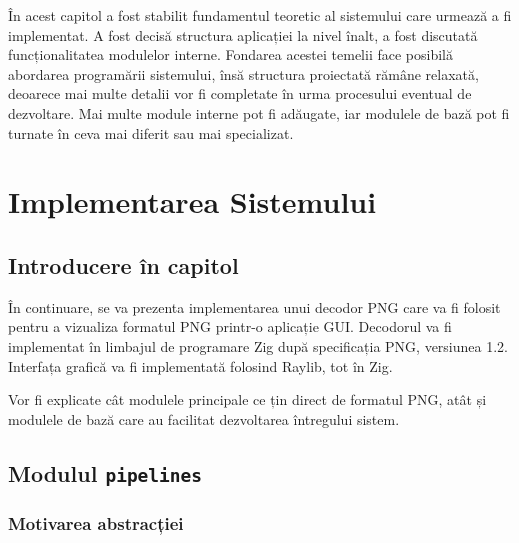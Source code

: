 \documentclass[a4paper,12pt]{report}
\begin{document}
În acest capitol a fost stabilit fundamentul teoretic al sistemului care urmează a fi implementat.
A fost decisă structura aplicației la nivel înalt, a fost discutată funcționalitatea modulelor interne.
Fondarea acestei temelii face posibilă abordarea programării sistemului,
însă structura proiectată rămâne relaxată, deoarece mai multe detalii
vor fi completate în urma procesului eventual de dezvoltare.
Mai multe module interne pot fi adăugate,
iar modulele de bază pot fi turnate în ceva mai diferit sau mai specializat.

\chapter{Implementarea Sistemului}\label{implementation_chapter_title}

\section{Introducere în capitol}

În continuare, se va prezenta implementarea unui decodor \ac{PNG} care va fi folosit pentru
a vizualiza formatul \ac{PNG} printr-o aplicație \ac{GUI}.
Decodorul va fi implementat în limbajul de programare Zig\cite{zig}
după specificația \ac{PNG}, versiunea 1.2\cite{png_spec}.
Interfața grafică va fi implementată folosind Raylib\cite{raylib}, tot în Zig.

Vor fi explicate cât modulele principale ce țin direct de formatul PNG,
atât și modulele de bază care au facilitat dezvoltarea întregului sistem.

\section{Modulul \texttt{pipelines}}

\subsection{Motivarea abstracției}
\end{document}
